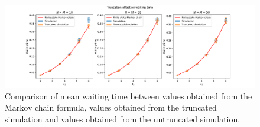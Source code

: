 



\begin{figure}[H]
    \includegraphics[width=\textwidth]{chapters/03_queueing_model/img/numeric_results_and_timings/truncation_effect/waiting/demo.pdf}
    \caption{
        Comparison of mean waiting time between values obtained from the Markov 
        chain formula, values obtained from the truncated simulation and values
        obtained from the untruncated simulation.
    }
    \label{fig:markov_vs_des_waiting_time_comparison_overall}
\end{figure}

